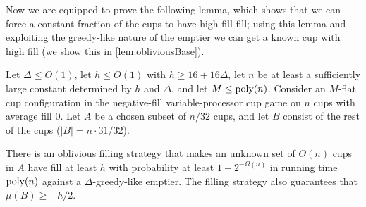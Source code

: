 Now we are equipped to prove the following lemma, which shows
that we can force a constant fraction of the cups to have high fill
fill; using this lemma and exploiting the greedy-like nature of
the emptier we can get a known cup with high fill
(we show this in \cref{lem:obliviousBase}).
\begin{lemma}
  \label{lem:obliviousManyUnknownCups}
  Let $\Delta \le O(1)$, let $h \le O(1)$ with $h \ge 16+16\Delta$, let
  $n$ be at least a sufficiently large constant
  determined by $h$ and $\Delta$, and let $M \le \operatorname{\text{poly}}(n)$.
  Consider an $M$-flat cup configuration in the negative-fill
  variable-processor cup game on $n$ cups with average fill $0$.
  Let $A$ be a chosen subset of $n/32$ cups, and let $B$ consist
  of the rest of the cups ($|B| = n\cdot 31/32$).

  There is an oblivious filling strategy that makes an unknown
  set of $\Theta(n)$ cups in $A$ have fill at least $h$ with
  probability at least $1-2^{-\Omega(n)}$ in running time
  $\operatorname{\text{poly}}(n)$ against a $\Delta$-greedy-like emptier.
  The filling strategy also guarantees that $\mu(B) \ge -h/2$.
\end{lemma}
